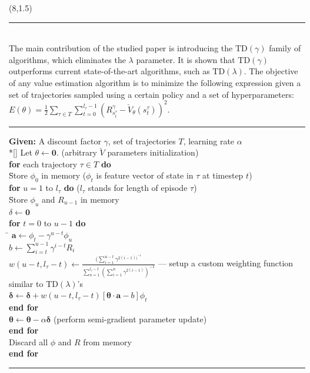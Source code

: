 \documentclass[a0]{a0poster}
\def\Head#1{\noindent{\LARGE\color{bluegray} #1}\bigskip}
\begin{document}
\begin{textblock}{7.0}(8,1.5)

\medskip
\hrule\medskip
\Head{$\text{TD}(\gamma)$ Algorithm}\\

The main contribution of the studied paper is introducing the
$\text{TD}(\gamma)$ family of algorithms, which eliminates the $\lambda$
parameter. It is shown that $\text{TD}(\gamma)$ outperforms current
state-of-the-art algorithms, such as $\text{TD}(\lambda)$. The objective of any
value estimation algorithm is to minimize the following expression given a set
of trajectories sampled using a certain policy and a set of hyperparameters:
$E(\theta) = \frac{1}{2} \sum_{\tau \in T} \sum_{t = 0}^{l_\tau - 1}
{(R_{s_t^\tau}^\gamma - \check{V}_\theta(s_t^\tau))}^2$.

\noindent\rule[-5pt]{.9\textwidth}{0.4pt}
{\footnotesize
\begin{tabbing}
    {\bf Given:} A discount factor $\gamma$, set of trajectories $T$, learning rate $\alpha$ \\*[\smallskipamount]
    Let $\theta \leftarrow \boldsymbol{0}$. (arbitrary $\check{V}$ parameters initialization) \\
    {\bf for} each trajectory $\tau \in T$ {\bf do} \\
      \qquad \= Store $\phi_0$ in memory ($\phi_t$ is feature vector of state in $\tau$ at timestep $t$) \\
      \> {\bf for} $u = 1$ to $l_\tau$ {\bf do} ($l_\tau$ stands for length of episode $\tau$) \\
      \> \qquad \= Store $\phi_u$ and $R_{u - 1}$ in memory \\
      \>  \> $\delta \leftarrow \boldsymbol{0}$ \\
      \>  \> {\bf for} $t = 0$ to $u - 1$ {\bf do} \\
      \>  \> \qquad \= $\boldsymbol{a} \leftarrow \phi_t - \gamma^{u - t} \phi_u$ \\
      \>  \>  \> $b \leftarrow \sum_{i = t}^{u - 1} \gamma^{i - t} R_i$ \\
      \>  \>  \> $w(u - t, l_\tau - t) \leftarrow \frac{(\sum_{i=1}^{u - t} \gamma^{2(i - 1))^{-1}}}{\sum_{n = 1}^{l_\tau - t} ({\sum_{i = 1}^n \gamma^{2(i - 1)}})^{-1}}$ --- setup a custom weighting function similar to $\text{TD}(\lambda)$'s \\
      \>  \>  \> $\boldsymbol{\delta} \leftarrow \boldsymbol{\delta} + w(u - t, l_{\tau} - t)[\boldsymbol{\theta} \cdot \boldsymbol{a} - b] \phi_t$ \\
      \>  \> {\bf end for} \\
      \>  \> $\boldsymbol{\theta} \leftarrow \boldsymbol{\theta} - \alpha \boldsymbol{\delta}$ (perform semi-gradient parameter update) \\
      \> {\bf end for} \\
      \> Discard all $\phi$ and $R$ from memory \\
    {\bf end for}
\end{tabbing}}
\noindent\rule[10pt]{.9\textwidth}{0.4pt}


\end{textblock}
\end{document}
